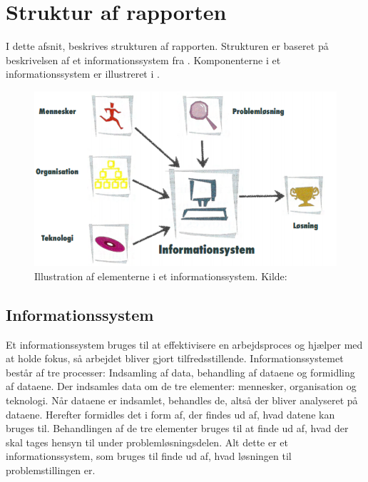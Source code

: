 \section{Struktur af rapporten}\label{sec:struktur-af-problemanalyse}

I dette afsnit, beskrives strukturen af rapporten. Strukturen er baseret på beskrivelsen af et
informationssystem fra \citet{Laudon1999}. Komponenterne i et informationssystem er illustreret i
.

\begin{figure}[htbp]
  \centering
  \includegraphics{images/kontekstmodel/metode.png}
  \caption[Metode for Kontekstmodellen]{Illustration af elementerne i et informationssystem. Kilde:
  \protect\citet{Laudon1999}}
  \label{fig:kontekstmodel}
\end{figure}


\subsection{Informationssystem}\label{subsec:Informationssystem}

Et informationssystem bruges til at effektivisere en arbejdsproces og hjælper med at holde fokus, så arbejdet
bliver gjort tilfredsstillende. Informationssystemet består af tre processer: Indsamling af data, behandling
af dataene og formidling af dataene. Der indsamles data om de tre elementer: mennesker, organisation og
teknologi. Når dataene er indsamlet, behandles de, altså der bliver analyseret på dataene. Herefter formidles
det i form af, der findes ud af, hvad datene kan bruges til. Behandlingen af de tre elementer bruges til at
finde ud af, hvad der skal tages hensyn til under problemløsningsdelen. Alt dette er et informationssystem,
som bruges til finde ud af, hvad løsningen til problemstillingen er.


